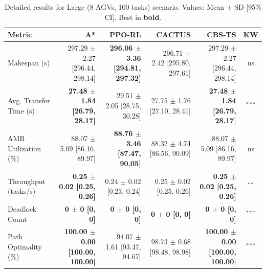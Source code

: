 \documentclass[review]{elsarticle}
\begin{document}
\begin{table}[htbp]
\centering
\caption{Detailed results for Large (8 AGVs, 100 tasks) scenario. Values: Mean $\pm$ SD [95\% CI]. Best in \textbf{bold}.}
\label{tab:detail_s3_large}
\small
\begin{tabular}{@{}lrrrrc@{}}
\toprule
\textbf{Metric} & \textbf{A*} & \textbf{PPO-RL} & \textbf{CACTUS} & \textbf{CBS-TS} & \textbf{KW} \\
\midrule
Makespan (s) & 297.29 $\pm$ 2.27 [296.44, 298.14] & \textbf{296.06 $\pm$ 3.36 [294.81, 297.32]} & 296.71 $\pm$ 2.42 [295.80, 297.61] & 297.29 $\pm$ 2.27 [296.44, 298.14] & ns \\
Avg. Transfer Time (s) & \textbf{27.48 $\pm$ 1.84 [26.79, 28.17]} & 29.51 $\pm$ 2.05 [28.75, 30.28] & 27.75 $\pm$ 1.76 [27.10, 28.41] & \textbf{27.48 $\pm$ 1.84 [26.79, 28.17]} & $^{***}$ \\
AMR Utilization (\%) & 88.07 $\pm$ 5.09 [86.16, 89.97] & \textbf{88.76 $\pm$ 3.46 [87.47, 90.05]} & 88.32 $\pm$ 4.74 [86.56, 90.09] & 88.07 $\pm$ 5.09 [86.16, 89.97] & ns \\
Throughput (tasks/s) & \textbf{0.25 $\pm$ 0.02 [0.25, 0.26]} & 0.24 $\pm$ 0.02 [0.23, 0.24] & 0.25 $\pm$ 0.02 [0.25, 0.26] & \textbf{0.25 $\pm$ 0.02 [0.25, 0.26]} & $^{**}$ \\
Deadlock Count & \textbf{0 $\pm$ 0 [0, 0]} & \textbf{0 $\pm$ 0 [0, 0]} & \textbf{0 $\pm$ 0 [0, 0]} & \textbf{0 $\pm$ 0 [0, 0]} & $^{***}$ \\
Path Optimality (\%) & \textbf{100.00 $\pm$ 0.00 [100.00, 100.00]} & 94.07 $\pm$ 1.61 [93.47, 94.67] & 98.73 $\pm$ 0.68 [98.48, 98.98] & \textbf{100.00 $\pm$ 0.00 [100.00, 100.00]} & $^{***}$ \\
\bottomrule
\end{tabular}
\end{table}
\end{document}
